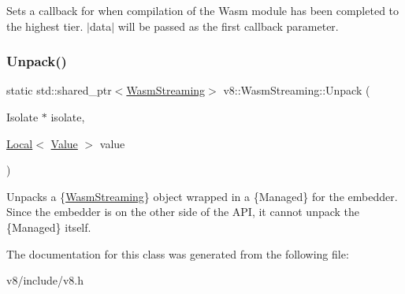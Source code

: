 Sets a callback for when compilation of the Wasm module has been completed to the highest tier. $\vert$data$\vert$ will be passed as the first callback parameter. \mbox{\label{classv8_1_1WasmStreaming_a343acdb301ae8c21b49c177ac28f2b07}} 
\subsubsection{\texorpdfstring{Unpack()}{Unpack()}}
{\footnotesize\ttfamily static std\+::shared\+\_\+ptr$<$\mbox{\hyperlink{classv8_1_1WasmStreaming}{Wasm\+Streaming}}$>$ v8\+::\+Wasm\+Streaming\+::\+Unpack (\begin{DoxyParamCaption}\item[{Isolate $\ast$}]{isolate,  }\item[{\mbox{\hyperlink{classv8_1_1Local}{Local}}$<$ \mbox{\hyperlink{classv8_1_1Value}{Value}} $>$}]{value }\end{DoxyParamCaption})\hspace{0.3cm}{\ttfamily [static]}}

Unpacks a \{\mbox{\hyperlink{classv8_1_1WasmStreaming}{Wasm\+Streaming}}\} object wrapped in a \{Managed\} for the embedder. Since the embedder is on the other side of the A\+PI, it cannot unpack the \{Managed\} itself. 

The documentation for this class was generated from the following file\+:\begin{DoxyCompactItemize}
\item 
v8/include/v8.\+h\end{DoxyCompactItemize}
